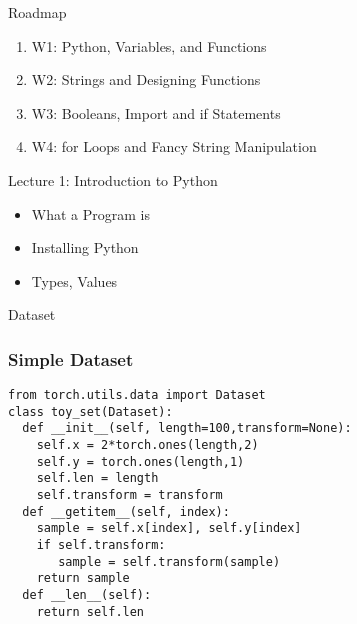 \documentclass[14 pt]{beamer}
\let\olditem\item
\renewcommand{\item}{\olditem\vspace{4pt}}
\newcommand{\Alert}[1]{\textcolor{Alert}{#1}} %
\begin{document}
\begin{frame}{Roadmap}
  \begin{enumerate}
[circle]
  \item \Alert{W1: Python, Variables, and Functions}
  \item W2: Strings and Designing Functions
  \item W3: Booleans, Import and if Statements
  \item W4: for Loops and Fancy String Manipulation
  \end{enumerate}
  \begin{block}{Lecture 1: Introduction to Python}
      \begin{itemize}
  \item What a Program is
  \item  Installing Python
  \item Types, Values
  \end{itemize}
  \end{block}
\end{frame}

\begin{frame}
\begin{center}
\Large{Dataset}
\end{center}
\end{frame}

\begin{frame}[fragile]
  \frametitle{Simple Dataset}
  \begin{block}{}
\small{
\begin{verbatim}
from torch.utils.data import Dataset 
class toy_set(Dataset):
  def __init__(self, length=100,transform=None):
    self.x = 2*torch.ones(length,2) 
    self.y = torch.ones(length,1)
    self.len = length
    self.transform = transform
  def __getitem__(self, index):
    sample = self.x[index], self.y[index]
    if self.transform:
       sample = self.transform(sample)
    return sample
  def __len__(self):
    return self.len
\end{verbatim}
}
  \end{block}
\end{frame}
\end{document}
